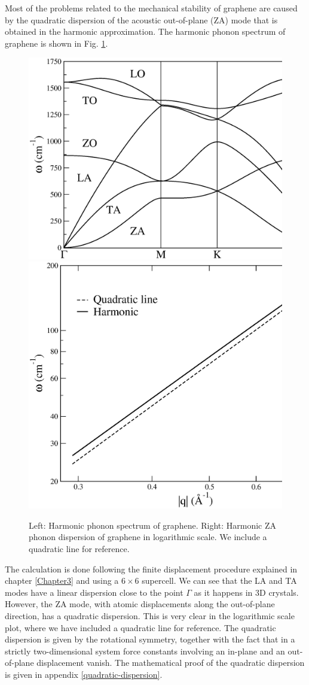 Most of the problems related to the mechanical stability of graphene are caused by the quadratic dispersion of the 
acoustic out-of-plane (ZA) mode that is obtained in the harmonic approximation. The harmonic phonon spectrum of 
graphene is shown in Fig. \ref{harmonic-graphene}.
\begin{figure}[h]
\includegraphics[width=0.55\linewidth]{Figures/harmonic-graphene.eps}
\includegraphics[width=0.45\linewidth]{Figures/harmonic-graphene-logarithmic.eps}
\caption[Graphene harmonic phonons]{Left: Harmonic phonon spectrum of graphene. Right: Harmonic ZA phonon dispersion 
	of graphene in logarithmic scale. We include a quadratic line for reference.}
\label{harmonic-graphene}
\end{figure}
The calculation is done following the finite displacement procedure explained in chapter \ref{Chapter3} and using 
a $6\times6$ supercell. 
We can see that the LA and TA modes have a linear dispersion close to the point $\Gamma$ as it happens in 3D 
crystals. However, the ZA mode, with atomic displacements along the out-of-plane direction, has a 
quadratic dispersion. This is very clear in the logarithmic scale plot, where we have included a quadratic line for 
reference. The quadratic dispersion is given by the rotational symmetry, together with the fact that in a strictly 
two-dimensional system force constants involving an in-plane and an out-of-plane displacement 
vanish\cite{katsnelson2013graphene}. The mathematical proof of the quadratic dispersion is given in 
appendix \ref{quadratic-dispersion}. \\

